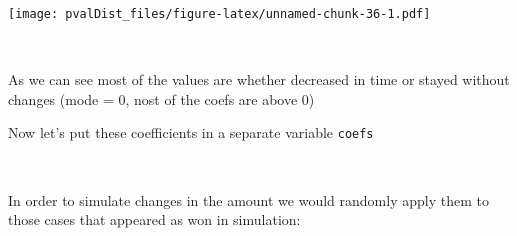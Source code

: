 \documentclass[]{article}
\newenvironment{Shaded}{\begin{snugshade}}{\end{snugshade}}
\newcommand{\NormalTok}[1]{#1}
\newcommand{\OperatorTok}[1]{\textcolor[rgb]{0.81,0.36,0.00}{\textbf{#1}}}
\newcommand{\StringTok}[1]{\textcolor[rgb]{0.31,0.60,0.02}{#1}}
\begin{document}
\texttt{[image: pvalDist\_files/figure-latex/unnamed-chunk-36-1.pdf]}

~

As we can see most of the values are whether decreased in time or stayed
without changes (mode = 0, nost of the coefs are above 0)

Now let's put these coefficients in a separate variable \texttt{coefs}

\begin{Shaded}
\end{Shaded}

~

In order to simulate changes in the amount we would randomly apply them
to those cases that appeared as won in simulation:
\end{document}
